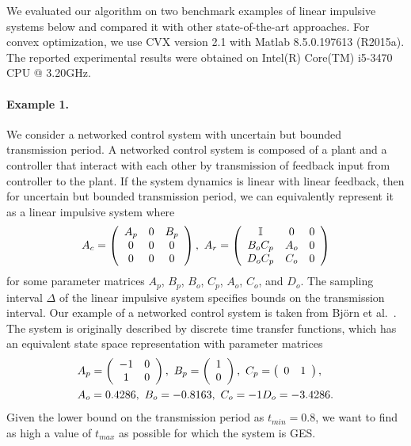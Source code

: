 We evaluated our algorithm on two benchmark examples of linear
impulsive systems below and compared it with other state-of-the-art
approaches.  For convex optimization, we use CVX version 2.1 with
Matlab 8.5.0.197613 (R2015a).  The reported experimental results were
obtained on Intel(R) Core(TM) i5-3470 CPU @ 3.20GHz.

\paragraph{ Example 1.  } We consider a networked control system with
uncertain but bounded transmission period.  A networked control system
is composed of a plant and a controller that interact with each other
by transmission of feedback input from controller to the plant.  If
the system dynamics is linear with linear feedback, then for uncertain
but bounded transmission period, we can equivalently represent it
as a linear impulsive system where
%
\[A_c=\left(\begin{array}{ccc} A_p & 0 & B_p\\ 0 & 0 &
  0\\ 0 & 0 & 0
\end{array}\right),~A_r=\left(\begin{array}{ccc}
\mathbb{I} & 0 & 0\\
B_oC_p & A_o & 0\\
D_oC_p & C_o & 0
\end{array}\right)\]
%
for some parameter matrices $A_p$, $B_p$, $B_o$,
$C_p$, $A_o$, $C_o$, and $D_o$.  The sampling interval $\Delta$ of the
linear impulsive system specifies bounds on the transmission interval.
%
Our example of a networked control system is taken from Bj\"{o}rn et
al.~\cite{wittenmark2002computer}.  The system is originally described
by discrete time transfer functions, which has an equivalent state
space representation with parameter matrices
%
\begin{align*}
& A_p=\left(\begin{array}{cc}-1 & 0\\ 1 & 0\end{array}\right),
 ~ B_p=\left(\begin{array}{c}1\\ 0\end{array}\right),
~ C_p=\left(\begin{array}{cc}0 & 1\end{array}\right),\\& A_o=0.4286,~
      B_o=-0.8163,~ C_o=-1 D_o=-3.4286.
\end{align*}
%
Given the lower bound on the transmission period as $t_{min}=0.8$, we
want to find as high a value of $t_{max}$ as possible for which
the system is GES.

